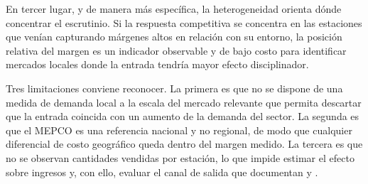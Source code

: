 En tercer lugar, y de manera más específica, la heterogeneidad orienta dónde concentrar el escrutinio. Si la respuesta competitiva se concentra en las estaciones que venían capturando márgenes altos en relación con su entorno, la posición relativa del margen es un indicador observable y de bajo costo para identificar mercados locales donde la entrada tendría mayor efecto disciplinador.

Tres limitaciones conviene reconocer. La primera es que no se dispone de una medida de demanda local a la escala del mercado relevante que permita descartar que la entrada coincida con un aumento de la demanda del sector. La segunda es que el MEPCO es una referencia nacional y no regional, de modo que cualquier diferencial de costo geográfico queda dentro del margen medido. La tercera es que no se observan cantidades vendidas por estación, lo que impide estimar el efecto sobre ingresos y, con ello, evaluar el canal de salida que documentan \textcite{ARCIDIACONO2020} y \textcite{KOH2022}.




